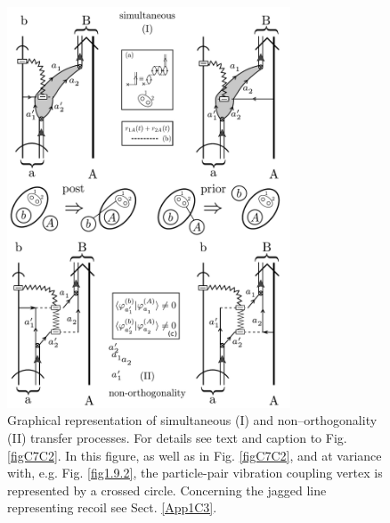 \begin{subappendices}
 \begin{figure}[h!]
 	\begin{center}
\includegraphics*[width=0.75\textwidth]{C7/figs_C7/Reaction1}
\end{center}
\caption{Graphical representation of simultaneous (I) and non--orthogonality (II) transfer processes. For details see text and  caption to Fig. \ref{figC7C2}. In this figure, as well as in Fig. \ref{figC7C2}, and at variance with, e.g. Fig. \ref{fig1.9.2}, the particle-pair vibration coupling vertex is represented by a crossed circle. Concerning the jagged line representing recoil see Sect. \ref{App1C3}.}\label{figC7C1}
\end{figure}
 \begin{figure}[h!]
 	\begin{center}

\end{center}
\end{figure}
\end{subappendices}
